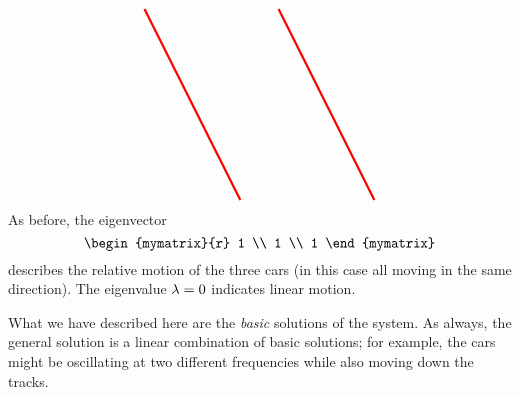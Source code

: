 \begin{solution}
\begin{itemize}
\begin{equation*}
\begin{tikzpicture}[scale=0.8, color=blue!50!black]
\begin{scope}[xshift=7.2cm,yshift=1cm,rotate=-90]
          \draw[ultra thick, red] (0,-1) -- (6,2);
        \end{scope}
        \begin{scope}[xshift=11.4cm,yshift=1cm,rotate=-90]
          \draw[ultra thick, red] (0,-1) -- (6,2);
        \end{scope}
      \end{tikzpicture}
    \end{equation*}
    As before, the eigenvector
    \begin{equation*}
      \begin{mymatrix}{r} 1 \\ 1 \\ 1 \end{mymatrix}
    \end{equation*}
    describes the relative motion of the three cars (in this case all
    moving in the same direction). The eigenvalue $\lambda=0$
    indicates linear motion. 
  \end{itemize}
  What we have described here are the {\em basic} solutions of the
  system. As always, the general solution is a linear combination of
  basic solutions; for example, the cars might be oscillating at two
  different frequencies while also moving down the tracks.
\end{solution}
